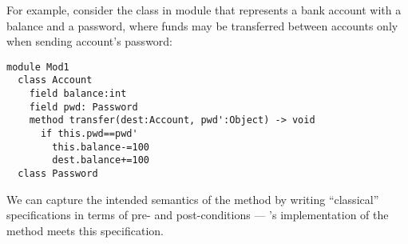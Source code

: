  
 



For example, consider the  class in module 
that represents a bank account
with a balance and a password, where funds may be transferred
between accounts only when sending account's password:

%
%

 
\begin{lstlisting}[language=Chainmail, frame=lines]
module Mod1
  class Account
    field balance:int 
    field pwd: Password
    method transfer(dest:Account, pwd':Object) -> void
      if this.pwd==pwd'
        this.balance-=100
        dest.balance+=100
  class Password
\end{lstlisting}

\noindent 
We can capture the intended
semantics of the  method by writing ``classical''
specifications in terms of pre- and post-conditions ---
's implementation of the  method meets
this specification.



